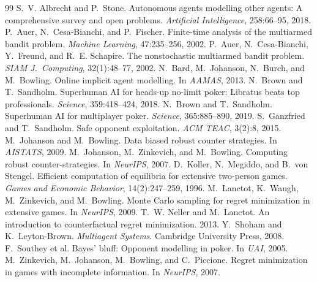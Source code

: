 \documentclass[11pt]{article}
\begin{document}
\begin{thebibliography}{99}\small\setlength{\itemsep}{0pt}
 S.~V. Albrecht and P.~Stone. Autonomous agents modelling other agents: A comprehensive survey and open problems. \emph{Artificial Intelligence}, 258:66--95, 2018.
 P.~Auer, N.~Cesa-Bianchi, and P.~Fischer. Finite-time analysis of the multiarmed bandit problem. \emph{Machine Learning}, 47:235--256, 2002.
 P.~Auer, N.~Cesa-Bianchi, Y.~Freund, and R.~E. Schapire. The nonstochastic multiarmed bandit problem. \emph{SIAM J.\ Computing}, 32(1):48--77, 2002.
 N.~Bard, M.~Johanson, N.~Burch, and M.~Bowling. Online implicit agent modelling. In \emph{AAMAS}, 2013.
 N.~Brown and T.~Sandholm. Superhuman AI for heads-up no-limit poker: Libratus beats top professionals. \emph{Science}, 359:418--424, 2018.
 N.~Brown and T.~Sandholm. Superhuman AI for multiplayer poker. \emph{Science}, 365:885--890, 2019.
 S.~Ganzfried and T.~Sandholm. Safe opponent exploitation. \emph{ACM TEAC}, 3(2):8, 2015.
 M.~Johanson and M.~Bowling. Data biased robust counter strategies. In \emph{AISTATS}, 2009.
 M.~Johanson, M.~Zinkevich, and M.~Bowling. Computing robust counter-strategies. In \emph{NeurIPS}, 2007.
 D.~Koller, N.~Megiddo, and B.~von Stengel. Efficient computation of equilibria for extensive two-person games. \emph{Games and Economic Behavior}, 14(2):247--259, 1996.
 M.~Lanctot, K.~Waugh, M.~Zinkevich, and M.~Bowling. Monte Carlo sampling for regret minimization in extensive games. In \emph{NeurIPS}, 2009.
 T.~W. Neller and M.~Lanctot. An introduction to counterfactual regret minimization. 2013.
 Y.~Shoham and K.~Leyton-Brown. \emph{Multiagent Systems}. Cambridge University Press, 2008.
 F.~Southey et al. Bayes' bluff: Opponent modelling in poker. In \emph{UAI}, 2005.
 M.~Zinkevich, M.~Johanson, M.~Bowling, and C.~Piccione. Regret minimization in games with incomplete information. In \emph{NeurIPS}, 2007.
\end{thebibliography}
\end{document}
